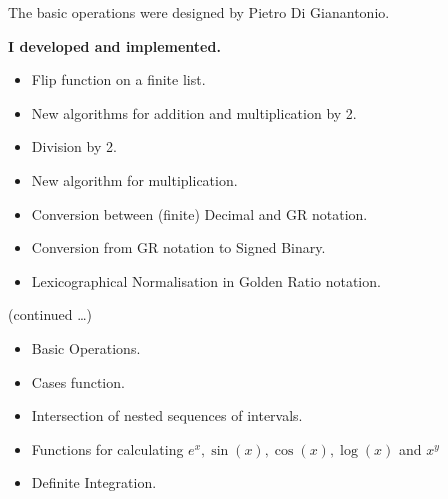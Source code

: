 \documentclass{csslides}\raggedright
\begin{document}
\begin{slide}{}
The basic operations were designed by Pietro Di Gianantonio.



{\bf I developed  and implemented.}
\begin{itemize}
\item Flip function on a finite list.
\item New algorithms for addition and multiplication by 2.
\item Division by 2.
\item New algorithm for multiplication.
\item Conversion between (finite) Decimal and GR notation.
\item Conversion from GR notation to Signed Binary.
\item Lexicographical Normalisation in Golden Ratio notation.
\end{itemize}
\hfill (continued \ldots)
\end{slide}

\begin{slide}{}
\begin{itemize}
\item Basic Operations.
\item Cases function.
\item Intersection of nested sequences of intervals.
\item Functions for calculating $e^{x}, \sin(x), \cos(x), \log(x)$ and $x^{y}$
\item Definite Integration.
\end{itemize}
\end{slide}
\end{document}
